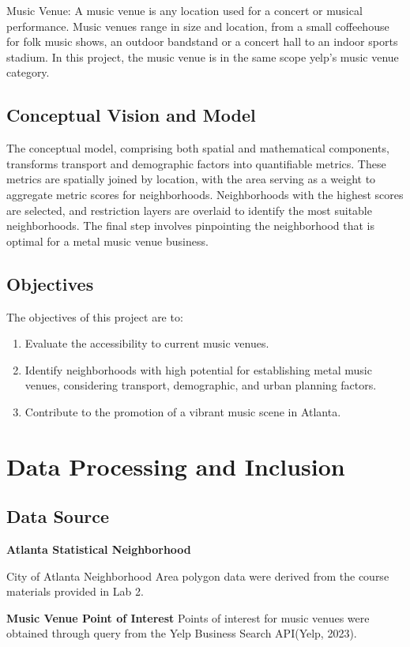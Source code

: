 \documentclass[11pt]{article}
\begin{document}
Music Venue: A music venue is any location used for a concert or musical performance. Music venues range in size and location, from a small coffeehouse for folk music shows, an outdoor bandstand or a concert hall to an indoor sports stadium.  In this project, the music venue is in the same scope yelp's music venue category.


\subsection{Conceptual Vision and Model}
The conceptual model, comprising both spatial and mathematical components, transforms transport and demographic factors into quantifiable metrics. These metrics are spatially joined by location, with the area serving as a weight to aggregate metric scores for neighborhoods. Neighborhoods with the highest scores are selected, and restriction layers are overlaid to identify the most suitable neighborhoods. The final step involves pinpointing the neighborhood that is optimal for a metal music venue business.
\subsection{Objectives}
The objectives of this project are to:
\begin{enumerate}
\item{Evaluate the accessibility to current music venues.}
\item{Identify neighborhoods with high potential for establishing metal music venues, considering transport, demographic, and urban planning factors.}
\item{Contribute to the promotion of a vibrant music scene in Atlanta.}
\end{enumerate}

\section{Data Processing and Inclusion}

\subsection{Data Source}

\textbf{Atlanta Statistical Neighborhood}

City of Atlanta Neighborhood Area polygon data were derived from the course materials provided in Lab 2.

\textbf{Music Venue Point of Interest}
Points of interest for music venues were obtained through query from the Yelp Business Search API(Yelp, 2023). 
\end{document}
